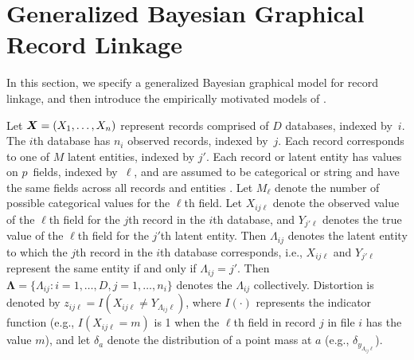\documentclass[11pt]{article}
\begin{document}
\section{Generalized Bayesian Graphical Record Linkage}
\label{sec:bayes}
In this section, we specify a generalized Bayesian graphical model for record linkage, and then introduce the empirically motivated models of \citep{steorts15entity}. 


Let $\bm{X}=(X_1,\ldots,X_n)$ represent records comprised of $D$ databases, indexed by~$i$.  The $i$th database has $n_i$ observed records, indexed by~$j$. Each record corresponds to one of $M$ latent entities, indexed by $j'$. Each record or latent entity has values on $p$~fields, indexed by~$\ell$, and are assumed to be categorical or string and have the same fields across all records and entities \cite{steorts14smered,steorts??bayesian}. Let $M_\ell$ denote the number of possible categorical values for the $\ell$th field. Let $X_{ij\ell}$ denote the observed value of the $\ell$th field for the $j$th record in the $i$th database, and $Y_{j'\ell}$ denotes the true value of the $\ell$th field for the $j'$th latent entity. Then $\Lambda_{ij}$ denotes the latent entity to which the $j$th record in the $i$th database corresponds, i.e., $X_{ij\ell}$ and $Y_{j'\ell}$ represent the same entity if and only if $\Lambda_{ij}=j'$.
%
Then $\bm\Lambda = \{\Lambda_{ij}: i = 1, \dots, D, j = 1, \dots, n_i\}$ denotes the $\Lambda_{ij}$ collectively. Distortion is denoted by $z_{ij\ell}=I(X_{ij\ell}\ne Y_{\Lambda_{ij}\ell})$, where $I(\cdot)$ represents the indicator function (e.g., $I(X_{ij\ell}=m)$ is 1 when the $\ell$th field in record $j$ in file $i$ has the value $m$), and let $\delta_a$ denote the distribution of a point mass at $a$ (e.g., $\delta_{y_{\Lambda_{ij}\ell}}$).
\end{document}
